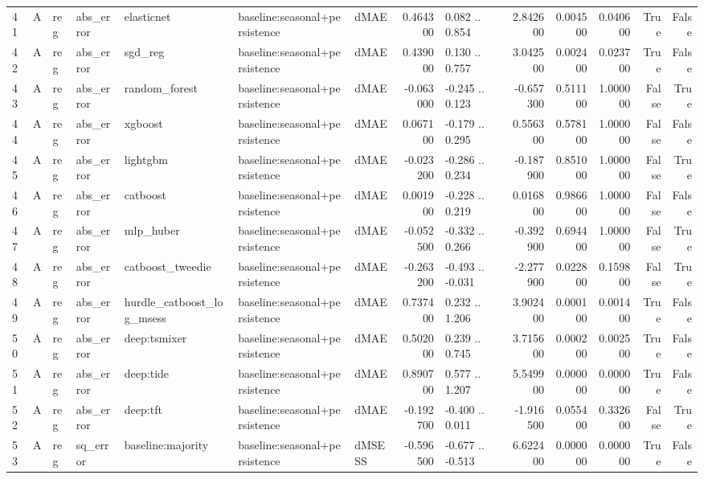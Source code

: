 \begin{table}
\begin{tabular}{lllllllrlrrrrr}
41 & A & reg & abs\_error & elasticnet & baseline:seasonal+persistence & dMAE & 0.464300 & 0.082 .. 0.854 & 2.842600 & 0.004500 & 0.040600 & True & False \\
42 & A & reg & abs\_error & sgd\_reg & baseline:seasonal+persistence & dMAE & 0.439000 & 0.130 .. 0.757 & 3.042500 & 0.002400 & 0.023700 & True & False \\
43 & A & reg & abs\_error & random\_forest & baseline:seasonal+persistence & dMAE & -0.063000 & -0.245 .. 0.123 & -0.657300 & 0.511100 & 1.000000 & False & True \\
44 & A & reg & abs\_error & xgboost & baseline:seasonal+persistence & dMAE & 0.067100 & -0.179 .. 0.295 & 0.556300 & 0.578100 & 1.000000 & False & False \\
45 & A & reg & abs\_error & lightgbm & baseline:seasonal+persistence & dMAE & -0.023200 & -0.286 .. 0.234 & -0.187900 & 0.851000 & 1.000000 & False & True \\
46 & A & reg & abs\_error & catboost & baseline:seasonal+persistence & dMAE & 0.001900 & -0.228 .. 0.219 & 0.016800 & 0.986600 & 1.000000 & False & False \\
47 & A & reg & abs\_error & mlp\_huber & baseline:seasonal+persistence & dMAE & -0.052500 & -0.332 .. 0.266 & -0.392900 & 0.694400 & 1.000000 & False & True \\
48 & A & reg & abs\_error & catboost\_tweedie & baseline:seasonal+persistence & dMAE & -0.263200 & -0.493 .. -0.031 & -2.277900 & 0.022800 & 0.159800 & False & True \\
49 & A & reg & abs\_error & hurdle\_catboost\_log\_msess & baseline:seasonal+persistence & dMAE & 0.737400 & 0.232 .. 1.206 & 3.902400 & 0.000100 & 0.001400 & True & False \\
50 & A & reg & abs\_error & deep:tsmixer & baseline:seasonal+persistence & dMAE & 0.502000 & 0.239 .. 0.745 & 3.715600 & 0.000200 & 0.002500 & True & False \\
51 & A & reg & abs\_error & deep:tide & baseline:seasonal+persistence & dMAE & 0.890700 & 0.577 .. 1.207 & 5.549900 & 0.000000 & 0.000000 & True & False \\
52 & A & reg & abs\_error & deep:tft & baseline:seasonal+persistence & dMAE & -0.192700 & -0.400 .. 0.011 & -1.916500 & 0.055400 & 0.332600 & False & True \\
53 & A & reg & sq\_error & baseline:majority & baseline:seasonal+persistence & dMSESS & -0.596500 & -0.677 .. -0.513 & 6.622400 & 0.000000 & 0.000000 & True & False \\

\end{tabular}
\end{table}
